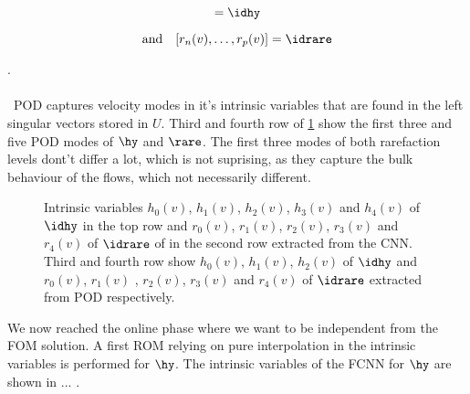 \begin{minipage}{0.45\textwidth}
	\begin{equation}
	[h_1(v),\dots,h_p(v)] = \idhy
	\end{equation}
\end{minipage}%
\begin{minipage}{0.45\textwidth}
	\begin{equation}
	\mathrm{and}\quad[r_n(v),\dots,r_p(v)] = \idrare
	\end{equation}
\end{minipage}.\\\\\
POD captures velocity modes in it's intrinsic variables that are found in the left singular vectors stored in \(U\). Third and fourth row of \cref{Fig: CNNPOD} show the first three and five POD modes of \(\hy\) and \(\rare\). The first three modes of both rarefaction levels dont't differ a lot, which is not suprising, as they capture the bulk behaviour of the flows, which not necessarily different.  
\begin{figure}[hbp!]
	
	\caption{Intrinsic variables \(h_0(v)\), \(h_1(v)\), \(h_2(v)\), \(h_3(v)\) and \(h_4(v)\) of \(\idhy\) in the top row and \(r_0(v)\), \(r_1(v)\), \(r_2(v)\), \(r_3(v)\) and \(r_4(v)\) of \(\idrare\) of in the second row extracted from the CNN. Third and fourth row show \(h_0(v)\), \(h_1(v)\), \(h_2(v)\) of \(\idhy\) and \(r_0(v)\), \(r_1(v)\) , \(r_2(v)\), \(r_3(v)\) and \(r_4(v)\) of \(\idrare\) extracted from POD respectively.}
	\label{Fig: CNNPOD}
\end{figure}
We now reached the online phase where we want to be independent from the FOM solution. A first ROM relying on pure interpolation in the intrinsic variables is performed for \(\hy\). The intrinsic variables of the FCNN for \(\hy\) are shown in ... . 

